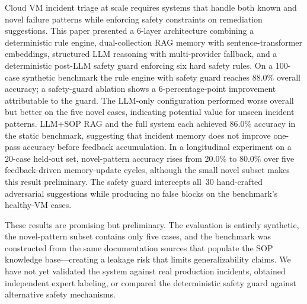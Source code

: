 \documentclass[a4paper,10pt,journal,compsoc]{IEEEtran}
\begin{document}
Cloud VM incident triage at scale requires systems that handle both
known and novel failure patterns while enforcing safety constraints on
remediation suggestions. This paper presented a 6-layer architecture
combining a deterministic rule engine, dual-collection RAG memory with
sentence-transformer embeddings, structured LLM reasoning with
multi-provider fallback, and a deterministic post-LLM safety guard
enforcing six hard safety rules. On a 100-case synthetic benchmark the
rule engine with safety guard reaches 88.0\% overall accuracy; a
safety-guard ablation shows a 6-percentage-point improvement
attributable to the guard. The LLM-only configuration performed worse
overall but better on the five novel cases, indicating potential value
for unseen incident patterns. LLM+SOP RAG and the full system each
achieved 86.0\% accuracy in the static benchmark, suggesting that
incident memory does not improve one-pass accuracy before feedback
accumulation. In a longitudinal experiment on a 20-case held-out
set, novel-pattern accuracy rises from 20.0\% to 80.0\% over five
feedback-driven memory-update cycles, although the small novel subset
makes this result preliminary. The safety guard intercepts all~30
hand-crafted adversarial suggestions while producing no false blocks
on the benchmark's healthy-VM cases.

These results are promising but preliminary. The evaluation is
entirely synthetic, the novel-pattern subset contains only five cases,
and the benchmark was constructed from the same documentation sources
that populate the SOP knowledge base---creating a leakage risk that
limits generalizability claims. We have not yet validated the system
against real production incidents, obtained independent expert
labeling, or compared the deterministic safety guard against
alternative safety mechanisms.
\end{document}
